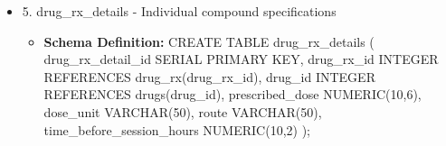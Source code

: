 \documentclass[12pt, titlepage]{article}
\begin{document}
\begin{itemize}
\begin{itemize}
{	      }
	\item{\textbf{Referenced By: }experimental\_sessions \textbf{Foreign Key: }drug\_rx\_id (Many-to-One: many sessions use same regimen)}
	\item{\textbf{Referenced By: }drug\_rx\_details  \textbf{Foreign Key: }drug\_rx\_id (One-to-Many: each regimen has multiple detail records)}
\end{itemize}

\item 5. drug\_rx\_details - Individual compound specifications

\begin{itemize}
	\item{\textbf{Schema Definition: }CREATE TABLE drug\_rx\_details (
	      drug\_rx\_detail\_id SERIAL PRIMARY KEY,
	      drug\_rx\_id INTEGER REFERENCES drug\_rx(drug\_rx\_id),
	      drug\_id INTEGER REFERENCES drugs(drug\_id),
	      prescribed\_dose NUMERIC(10,6),
	      dose\_unit VARCHAR(50),
	      route VARCHAR(50),
	      time\_before\_session\_hours NUMERIC(10,2)
	      );


	      }
\end{itemize}


\end{itemize}
\end{document}
